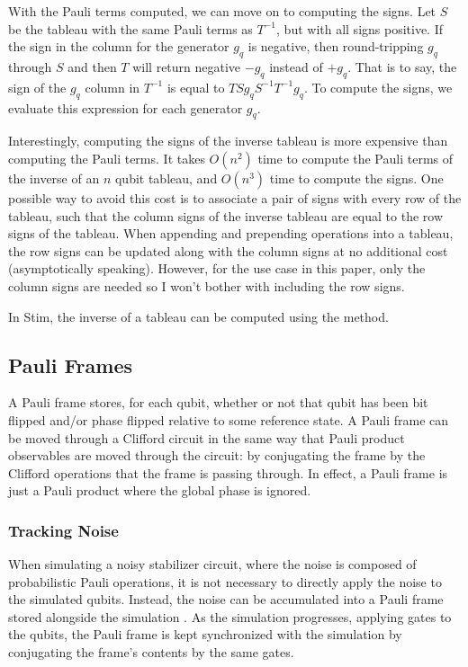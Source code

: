 \documentclass[onecolumn,unpublished]{quantumarticle}
\theoremstyle{definition}
\theoremstyle{definition}
\theoremstyle{definition}
\begin{document}
With the Pauli terms computed, we can move on to computing the signs.
Let $S$ be the tableau with the same Pauli terms as $T^{-1}$, but with all signs positive.
If the sign in the column for the generator $g_q$ is negative, then round-tripping $g_q$ through $S$ and then $T$ will return negative $-g_q$ instead of $+g_q$.
That is to say, the sign of the $g_q$ column in $T^{-1}$ is equal to $T Sg_q S^{-1} T^{-1} g_q$.
To compute the signs, we evaluate this expression for each generator $g_q$.

Interestingly, computing the signs of the inverse tableau is more expensive than computing the Pauli terms.
It takes $O(n^2)$ time to compute the Pauli terms of the inverse of an $n$ qubit tableau, and $O(n^3)$ time to compute the signs.
One possible way to avoid this cost is to associate a pair of signs with every row of the tableau, such that the column signs of the inverse tableau are equal to the row signs of the tableau.
When appending and prepending operations into a tableau, the row signs can be updated along with the column signs at no additional cost (asymptotically speaking).
However, for the use case in this paper, only the column signs are needed so I won't bother with including the row signs.

In Stim, the inverse of a tableau can be computed using the  method.

\subsection{Pauli Frames}

A Pauli frame stores, for each qubit, whether or not that qubit has been bit flipped and/or phase flipped relative to some reference state.
A Pauli frame can be moved through a Clifford circuit in the same way that Pauli product observables are moved through the circuit: by conjugating the frame by the Clifford operations that the frame is passing through.
In effect, a Pauli frame is just a Pauli product where the global phase is ignored.

\subsubsection{Tracking Noise}

When simulating a noisy stabilizer circuit, where the noise is composed of probabilistic Pauli operations, it is not necessary to directly apply the noise to the simulated qubits.
Instead, the noise can be accumulated into a Pauli frame stored alongside the simulation \cite{knill2005quantum}.
As the simulation progresses, applying gates to the qubits, the Pauli frame is kept synchronized with the simulation by conjugating the frame's contents by the same gates.
\end{document}
